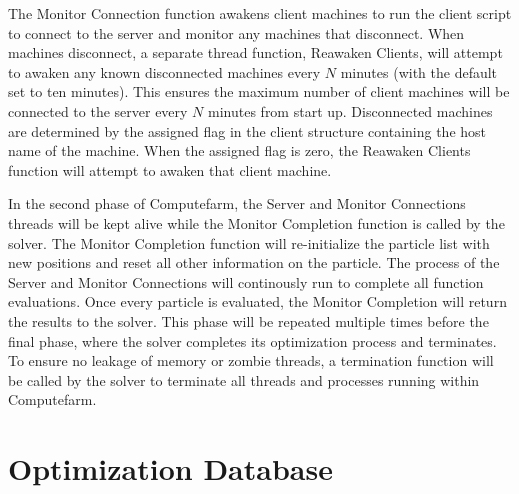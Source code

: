 The Monitor Connection function awakens client machines to run the client script to connect to the server and monitor any machines that disconnect. When machines disconnect, a separate thread function, Reawaken Clients, will attempt to awaken any known disconnected machines every $N$ minutes (with the default set to ten minutes). This ensures the maximum number of client machines will be connected to the server every $N$ minutes from start up. Disconnected machines are determined by the assigned flag in the client structure containing the host name of the machine. When the assigned flag is zero, the Reawaken Clients function will attempt to awaken that client machine. 


In the second phase of Computefarm, the Server and Monitor Connections threads will be kept alive while the Monitor Completion function is called by the solver. The Monitor Completion function will re-initialize the particle list with new positions and reset all other information on the particle. The process of the Server and Monitor Connections will continously run to complete all function evaluations. Once every particle is evaluated, the Monitor Completion will return the results to the solver. This phase will be repeated multiple times before the final phase, where the solver completes its optimization process and terminates. To ensure no leakage of memory or zombie threads, a termination function will be called by the solver to terminate all threads and processes running within Computefarm. 


\section{Optimization Database}
\label{database}
